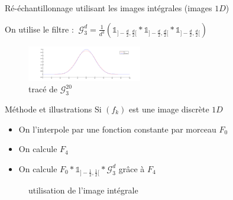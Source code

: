 \documentclass[c,12pt]{beamer}
\begin{document}
\begin{frame}{Ré-échantillonnage utilisant les images intégrales (images $1D$)}
\small{
On utilise le filtre :
$~
\mathcal{G}_3^d= \frac{1}{d^3}(\mathds{1}_{]-\frac{d}{2},\frac{d}{2}[} * \mathds{1}_{]-\frac{d}{2},\frac{d}{2}[} * \mathds{1}_{]-\frac{d}{2},\frac{d}{2}[})
$
\begin{block}{Si $f$ est continue par morceau}
\begin{equation*}
(f*\mathcal{G}_3^d)(y)=\frac{F_3(y+\frac{3d}{2})-3F_3(y+\frac{d}{2})+3F_3(y-\frac{d}{2})-F_3(y-\frac{3d}{2})}{d^3}
\end{equation*}}
$F_3$ primitive troisième de $f$
\end{block}}
\begin{figure}
\centering
\includegraphics[width=5cm]{filtre_g3.png}
\caption{tracé de $\mathcal{G}_3^20$}
\end{figure}
\end{frame}
\begin{frame}{Méthode et illustrations}
Si $(f_k)$ est une image discrète $1D$ 
\begin{itemize}
\item On l'interpole par une fonction constante par morceau $F_0$
\item On calcule $F_4$   
\item On calcule $F_0 *\mathds{1}_{]-\frac{1}{2},\frac{1}{2}[}*\mathcal{G}_3^d$ grâce à $F_4$
\end{itemize}
\begin{figure}
\centering
{}
\caption{utilisation de l'image intégrale}
\end{figure}
\end{frame}
\end{document}
